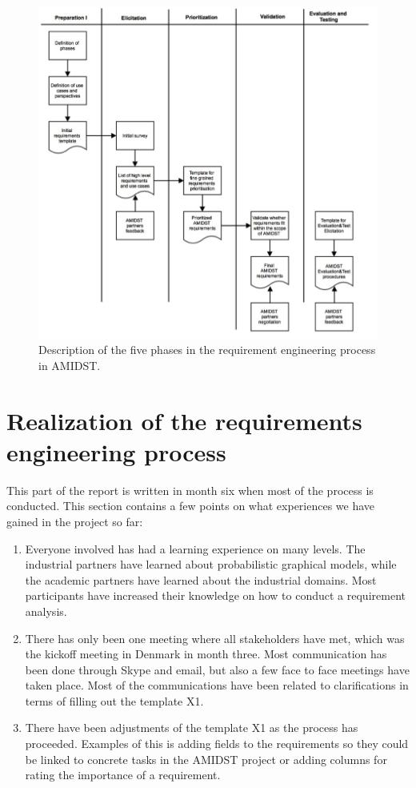 \documentclass[11pt, oneside]{article}   	%
\begin{document}
\begin{figure}
\centering
\includegraphics [keepaspectratio,width = 14cm] {REprocess1}
\caption{Description of the five phases in the requirement engineering process in AMIDST.}
\label{REprocess1}
\end{figure}

\section{Realization of the requirements engineering process}
\label{sec:realization}

This part of the report is written in month six when most of the process is conducted.  This section contains a few points on what experiences we have gained in the project so far:

\begin{enumerate}
\item Everyone involved has had a learning experience on many levels.  The industrial partners have learned about probabilistic graphical models, while the academic partners have learned about the industrial domains.  Most participants have increased their knowledge on how to conduct a requirement analysis. 
\item There has only been one meeting where all stakeholders have met, which was the kickoff meeting in Denmark in month three.  Most communication has been done through Skype and email, but also a few face to face meetings have taken place. Most of the communications have been related to clarifications in terms of filling out the template X1.
\item There have been adjustments of the template X1 as the process has proceeded.  Examples of this is adding fields to the requirements so they could be linked to concrete tasks in the AMIDST project or adding columns for rating the importance of a requirement.
\end{enumerate}
\end{document}
